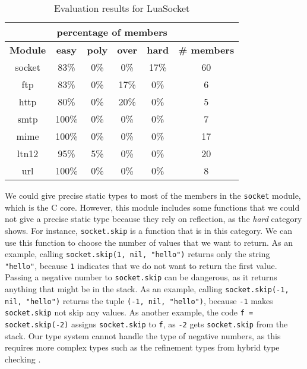 \begin{table}[!ht]
\begin{center}
\begin{tabular}{|c|c|c|c|c|c|}
\cline{2-5}
\multicolumn{1}{c}{} & \multicolumn{4}{|c|}{percentage of members} & \multicolumn{1}{c}{} \\
\hline
\textbf{Module} & \textbf{easy} & \textbf{poly} & \textbf{over} & \textbf{hard} & \textbf{\# members} \\
\hline
socket & 83\% & 0\% & 0\% & 17\% & 60 \\ %
\hline
ftp & 83\% & 0\% & 17\% & 0\% & 6 \\ %
\hline
http & 80\% & 0\% & 20\% & 0\% & 5 \\ %
\hline
smtp & 100\% & 0\% & 0\% & 0\% & 7 \\ %
\hline
mime & 100\% & 0\% & 0\% & 0\% & 17 \\ %
\hline
ltn12 & 95\% & 5\% & 0\% & 0\% & 20 \\ %
\hline
url & 100\% & 0\% & 0\% & 0\% & 8 \\ %
\hline
\end{tabular}
\end{center}
\caption{Evaluation results for LuaSocket}
\label{tab:evalsocket}
\end{table}

We could give precise static types to most of the members
in the \texttt{socket} module, which is the C core.
However, this module includes some functions that
we could not give a precise static type because they
rely on reflection, as the \emph{hard} category shows.
For instance, \texttt{socket.skip} is a function that is
in this category.
We can use this function to choose the number of
values that we want to return.
As an example, calling \texttt{socket.skip(1, nil, "hello")}
returns only the string \texttt{"hello"}, because \texttt{1} indicates
that we do not want to return the first value.
Passing a negative number to \texttt{socket.skip} can be
dangerous, as it returns anything that might be in the stack.
As an example, calling \texttt{socket.skip(-1, nil, "hello")}
returns the tuple \texttt{(-1, nil, "hello")}, because \texttt{-1} makes
\texttt{socket.skip} not skip any values.
As another example, the code \texttt{f = socket.skip(-2)} assigns \texttt{socket.skip}
to \texttt{f}, as \texttt{-2} gets \texttt{socket.skip} from the stack.
Our type system cannot handle the type of negative numbers, as
this requires more complex types such as the refinement types from
hybrid type checking \cite{flanagan2006htc}.

